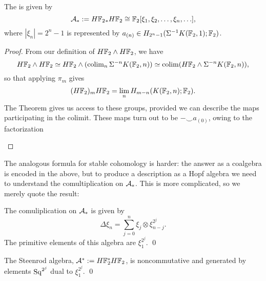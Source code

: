 \begin{corollary}
The  is given by \[\mathcal A_* := H\mathbb F_2{}_* H\mathbb F_2 \cong \mathbb F_2[\xi_1, \xi_2, \ldots, \xi_n, \ldots],\] where $|\xi_n| = 2^n - 1$ is represented by $a_{(n)} \in H_{2^n-1}(\Sigma^{-1} K(\mathbb F_2, 1); \mathbb F_2)$.
\end{corollary}
\begin{proof}
From our definition of $H\mathbb F_2 \wedge H\mathbb F_2$, we have \[H\mathbb F_2 \wedge H\mathbb F_2 \simeq H\mathbb F_2 \wedge (\operatorname{colim}_n \Sigma^{-n} K(\mathbb F_2, n)) \simeq \operatorname{colim} (H\mathbb F_2 \wedge \Sigma^{-n} K(\mathbb F_2, n)),\] so that applying $\pi_m$ gives \[(H\mathbb F_2)_m H\mathbb F_2 = \lim_n H_{m-n}(K(\mathbb F_2, n); \mathbb F_2).\]
The Theorem gives us access to these groups, provided we can describe the maps participating in the colimit.
These maps turn out to be $- \smile a_{(0)}$, owing to the factorization
\begin{center}
\end{center}
\end{proof}

The analogous formula for stable cohomology is harder: the answer as a coalgebra is encoded in the above, but to produce a description as a Hopf algebra we need to understand the comultiplication on $\mathcal A_*$.
This is more complicated, so we merely quote the result:
\begin{lemma}
The comuliplication on $\mathcal A_*$ is given by
\[\Delta \xi_n = \sum_{j=0}^n \xi_j \otimes \xi_{n-j}^{2^j}.\]
The primitive elements of this algebra are $\xi_1^{2^j}$.
\qed
\end{lemma}

\begin{corollary}
The Steenrod algebra, $\mathcal A^* := H\mathbb F_2^* H\mathbb F_2$, is noncommutative and generated by elements $\mathrm{Sq}^{2^j}$ dual to $\xi_1^{2^j}$.
\qed
\end{corollary}

